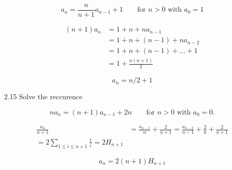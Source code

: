 \documentclass[12pt]{article}
\begin{document}
\begin{equation}
a_{n} = \frac{n}{n + 1}a_{n-1} + 1 \qquad \text{for ${n > 0}$ with ${a_{0} = 1}$} \nonumber
\end{equation}

\begin{equation}
\begin{split}
(n + 1)a_{n} & = 1 + n + na_{n - 1} \\
	     & = 1 + n + (n - 1) + na_{n - 2} \\
	     & = 1 + n + (n - 1) + \dots + 1 \\
	     & = 1 + \frac{n(n + 1)}{2} \nonumber
\end{split}
\end{equation}

\begin{equation}
	a_{n} = n/2 + 1 \nonumber
\end{equation}


\bigskip

2.15
Solve the reccurence

\begin{equation}
na_{n} = (n + 1)a_{n - 1} + 2n \qquad \text{for ${n > 0}$ with ${a_{0} = 0}$.} \nonumber
\end{equation}

\begin{equation}
\begin{split}
\frac{a_{n}}{n + 1} & = \frac{a_{n - 1}}{n} + \frac{2}{n + 1} = \frac{a_{n - 2}}{n - 1} + \frac{2}{n} + \frac{2}{n + 1} \\
	= 2\sum_{1 \leq i \leq n + 1}\frac{1}{i} = 2H_{n + 1} \nonumber
\end{split}
\end{equation}


\begin{equation}
a_{n} = 2(n + 1)H_{n + 1} \nonumber
\end{equation}
\end{document}
